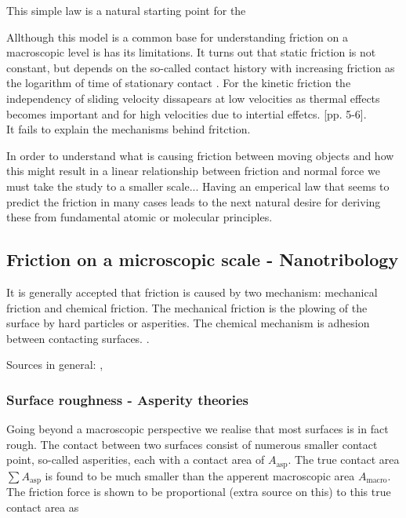 This simple law is a natural starting point for the

Allthough this model is a common base for understanding friction on a macroscopic level is has its limitations. It turns out that static
friction is not constant, but depends on the so-called contact history with increasing friction as the logarithm of time of stationary
contact \cite{dieterich_1972}. For the kinetic friction the independency of sliding velocity dissapears at low velocities as thermal effects
becomes important and for high velocities due to intertial effetcs. \cite{gnecco_meyer_2015}[pp. 5-6]. \\

It fails to explain the mechanisms behind fritction.
 

In order to understand what is causing friction between moving objects and how this might result in a linear relationship between friction
and normal force we must take the study to a smaller scale... Having an emperical law that seems to predict the friction in many cases leads
to the next natural desire for deriving these from fundamental atomic or molecular principles.

\subsection{Friction on a microscopic scale - Nanotribology}
It is generally accepted that friction is caused by two mechanism: mechanical friction and chemical friction. The mechanical friction is the
plowing of the surface by hard particles or asperities. The chemical mechanism is adhesion between contacting surfaces.
\cite{kim_nano-scale_2009}.


Sources in general: \cite{mo_friction_2009}, \cite{kim_nano-scale_2009} \\

\subsubsection{Surface roughness - Asperity theories}

Going beyond a macroscopic perspective we realise that most surfaces is in fact rough. The contact between two surfaces consist of numerous
smaller contact point, so-called asperities, each with a contact area of $A_{\text{asp}}$. The true contact area $\sum A_{\text{asp}}$ is
found to be much smaller than the apperent macroscopic area $A_{\text{macro}}$. The friction force is shown to be proportional (extra source
on this) to this true contact area as 

